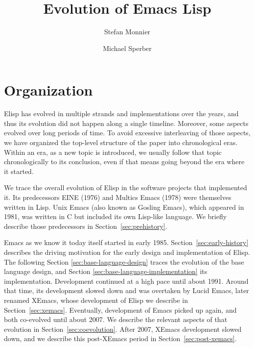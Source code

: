 \documentclass[format=acmsmall, review=false, screen=true]{acmart}
\newcommand \Elisp {Elisp}
\begin{document}
\title{Evolution of Emacs Lisp}

\author{Stefan Monnier}
\author{Michael Sperber}





%
%




\maketitle

\tableofcontents

\section{Organization}

\Elisp{} has evolved in multiple strands and implementations over the
years, and thus its evolution did not happen along a single timeline.
Moreover, some aspects evolved over long periods of time.  To avoid
excessive interleaving of those aspects, we have organized the
top-level structure of the paper into chronological eras.  Within an
era, as a new topic is introduced, we usually follow that topic
chronologically to its conclusion, even if that means going beyond the
era where it started.

We trace the overall evolution of \Elisp{} in the software projects that
implemented it.  Its predecessors EINE (1976) and Multics Emacs (1978) were
themselves written in Lisp.  Unix Emacs (also known as Gosling Emacs), which
appeared in 1981, was written in C but included its own Lisp-like language.
We briefly describe those predecessors in Section~\ref{sec:prehistory}.

Emacs as we know it today itself started in early 1985.  
Section~\ref{sec:early-history} describes the driving motivation for
the early design and implementation of \Elisp.  The following Section
\ref{sec:base-language-design} traces the evolution of the base
language design, and Section \ref{sec:base-language-implementation}
its implementation.
Development continued at a high pace until about 1991.
Around that time, its development slowed down and
was overtaken by Lucid Emacs, later renamed XEmacs, whose development of
\Elisp{} we describe in Section~\ref{sec:xemacs}.  Eventually,
development of Emacs picked up again, and both co-evolved until about
2007.  We describe the relevant aspects of that evolution in
Section~\ref{sec:coevolution}.  After 2007, XEmacs development slowed
down, and we describe this post-XEmacs period in
Section~\ref{sec:post-xemacs}.
\end{document}
